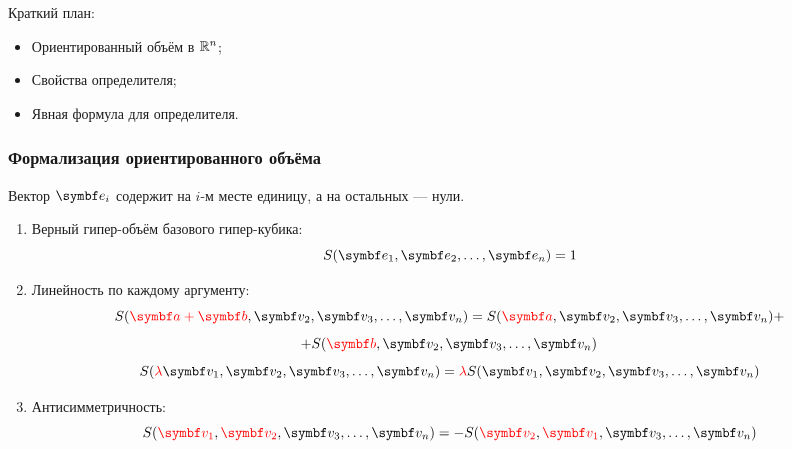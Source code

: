 
\begin{frame} %


\end{frame}



\begin{frame}{Краткий план:}
  \begin{itemize}[<+->]
    \item Ориентированный объём в $\mathbb{R}^n$;
    \item Свойства определителя;
    \item Явная формула для определителя.
  \end{itemize}

\end{frame}




\begin{frame}
    \frametitle{Формализация ориентированного объёма}


    Вектор $\be_i$ содержит на $i$-м месте единицу, а на остальных — нули.
    \pause

    \begin{enumerate}
        \item Верный гипер-объём базового гипер-кубика:
        \[
        S(\be_1, \be_2, \ldots, \be_n) = 1    
        \]
        \pause
        \item Линейность по каждому аргументу:
        \[
            S(\red{\ba + \bb}, \bv_2, \bv_3, \ldots, \bv_n) =  S(\red{\ba}, \bv_2, \bv_3, \ldots, \bv_n) + 
        \]
        \[
            + S(\red{\bb}, \bv_2, \bv_3, \ldots, \bv_n)          
        \]
        \[
            S(\red{\lambda}\bv_1, \bv_2, \bv_3, \ldots, \bv_n) = \red{ \lambda } S(\bv_1, \bv_2, \bv_3, \ldots, \bv_n)
        \]
        \pause
        \item Антисимметричность: 
        \[
          S(\red{\bv_1}, \red{\bv_2}, \bv_3, \ldots, \bv_n) = - S(\red{\bv_2}, \red{\bv_1}, \bv_3, \ldots, \bv_n)  
        \]
    \end{enumerate}
\end{frame}



